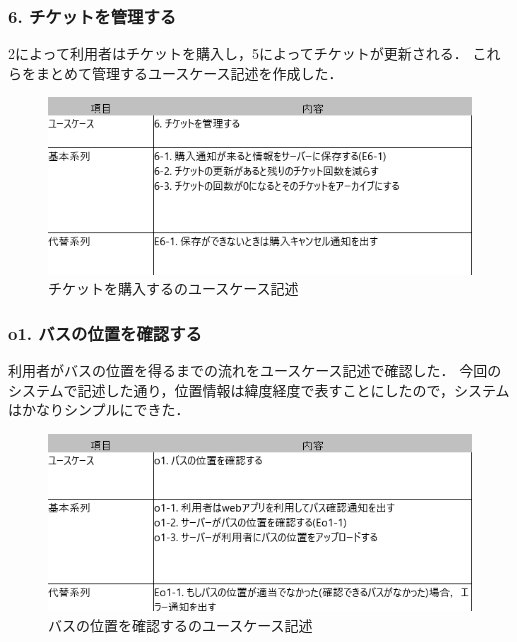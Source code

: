 \documentclass[documentclass]{jsarticle}
\begin{document}
\subsubsection*{6. チケットを管理する}
2によって利用者はチケットを購入し，5によってチケットが更新される．
これらをまとめて管理するユースケース記述を作成した．


\begin{figure}[H]
  \begin{center}
    \includegraphics*[scale=0.6]{figure/4-6.png}
  \end{center}
  \caption{チケットを購入するのユースケース記述}
  \label{fig:4-6}
\end{figure}

\subsubsection*{o1. バスの位置を確認する}
利用者がバスの位置を得るまでの流れをユースケース記述で確認した．
今回のシステムで記述した通り，位置情報は緯度経度で表すことにしたので，システムはかなりシンプルにできた．

\begin{figure}[H]
  \begin{center}
    \includegraphics*[scale=0.6]{figure/4-7.png}
  \end{center}
  \caption{バスの位置を確認するのユースケース記述}
  \label{fig:4-7}
\end{figure}
\end{document}
